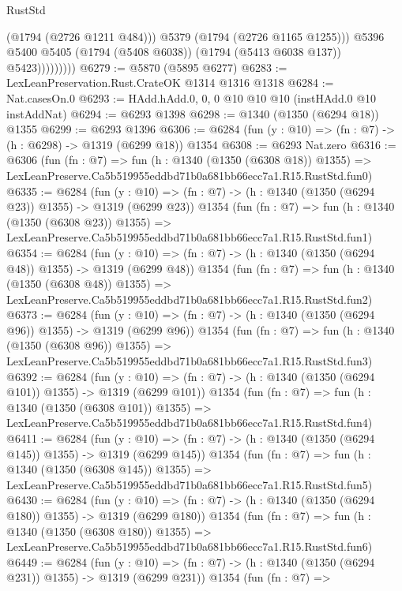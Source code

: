 \begin{lexlean}{RustStd}
\begin{coremodule}
                          (@1794 (@2726 @1211 @484)))
                        @5379
                        (@1794 (@2726 @1165 @1255)))
                      @5396
                      @5400
                      @5405
                      (@1794 (@5408 @6038))
                      (@1794 (@5413 @6038 @137))
                      @5423)))))))))
@6279 := @5870 (@5895 @6277)
@6283 := LexLeanPreservation.Rust.CrateOK @1314 @1316 @1318
@6284 := Nat.casesOn.{0}
@6293 := HAdd.hAdd.{0, 0, 0} @10 @10 @10 (instHAdd.{0} @10 instAddNat)
@6294 := @6293 @1398
@6298 := @1340 (@1350 (@6294 @18)) @1355
@6299 := @6293 @1396
@6306 := @6284 (fun (y : @10) => (fn : @7) -> (h : @6298) -> @1319 (@6299 @18)) @1354
@6308 := @6293 Nat.zero
@6316 := @6306
    (fun (fn : @7) =>
    fun (h : @1340 (@1350 (@6308 @18)) @1355) =>
    LexLeanPreserve.Ca5b519955eddbd71b0a681bb66ecc7a1.R15.RustStd.fun0)
@6335 := @6284
    (fun (y : @10) => (fn : @7) -> (h : @1340 (@1350 (@6294 @23)) @1355) -> @1319 (@6299 @23))
    @1354
    (fun (fn : @7) =>
    fun (h : @1340 (@1350 (@6308 @23)) @1355) =>
    LexLeanPreserve.Ca5b519955eddbd71b0a681bb66ecc7a1.R15.RustStd.fun1)
@6354 := @6284
    (fun (y : @10) => (fn : @7) -> (h : @1340 (@1350 (@6294 @48)) @1355) -> @1319 (@6299 @48))
    @1354
    (fun (fn : @7) =>
    fun (h : @1340 (@1350 (@6308 @48)) @1355) =>
    LexLeanPreserve.Ca5b519955eddbd71b0a681bb66ecc7a1.R15.RustStd.fun2)
@6373 := @6284
    (fun (y : @10) => (fn : @7) -> (h : @1340 (@1350 (@6294 @96)) @1355) -> @1319 (@6299 @96))
    @1354
    (fun (fn : @7) =>
    fun (h : @1340 (@1350 (@6308 @96)) @1355) =>
    LexLeanPreserve.Ca5b519955eddbd71b0a681bb66ecc7a1.R15.RustStd.fun3)
@6392 := @6284
    (fun (y : @10) => (fn : @7) -> (h : @1340 (@1350 (@6294 @101)) @1355) -> @1319 (@6299 @101))
    @1354
    (fun (fn : @7) =>
    fun (h : @1340 (@1350 (@6308 @101)) @1355) =>
    LexLeanPreserve.Ca5b519955eddbd71b0a681bb66ecc7a1.R15.RustStd.fun4)
@6411 := @6284
    (fun (y : @10) => (fn : @7) -> (h : @1340 (@1350 (@6294 @145)) @1355) -> @1319 (@6299 @145))
    @1354
    (fun (fn : @7) =>
    fun (h : @1340 (@1350 (@6308 @145)) @1355) =>
    LexLeanPreserve.Ca5b519955eddbd71b0a681bb66ecc7a1.R15.RustStd.fun5)
@6430 := @6284
    (fun (y : @10) => (fn : @7) -> (h : @1340 (@1350 (@6294 @180)) @1355) -> @1319 (@6299 @180))
    @1354
    (fun (fn : @7) =>
    fun (h : @1340 (@1350 (@6308 @180)) @1355) =>
    LexLeanPreserve.Ca5b519955eddbd71b0a681bb66ecc7a1.R15.RustStd.fun6)
@6449 := @6284
    (fun (y : @10) => (fn : @7) -> (h : @1340 (@1350 (@6294 @231)) @1355) -> @1319 (@6299 @231))
    @1354
    (fun (fn : @7) =>

\end{coremodule}
\end{lexlean}
